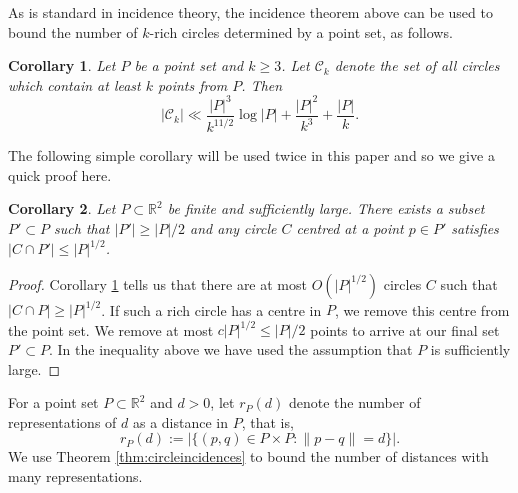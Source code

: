 \documentclass[11pt,oneside]{amsart}
\numberwithin{exercise}{subsection}
\newtheorem{cor}{Corollary}
\begin{document}
As is standard in incidence theory, the incidence theorem above can be used to bound the number of $k$-rich circles determined by a point set, as follows.

\begin{cor} \label{cor:richcircles}
Let $P$ be a point set and $k \geq 3$. Let $\mathcal C_k$ denote the set of all circles which contain at least $k$ points from $P$. Then
\[
|\mathcal C_k| \ll \frac{|P|^3}{k^{11/2}}\log|P| + \frac{|P|^2}{k^{3}}+ \frac{|P|}{k}.  
\]
\end{cor}

The following simple corollary will be used twice in this paper and so we give a quick proof here.

\begin{cor} \label{cor:norichcircles}
    Let $P \subset \mathbb R^2$ be finite and sufficiently large. There exists a subset $P' \subset P$ such that $|P'| \geq |P|/2$ and any circle $C$ centred at a point $p \in P'$ satisfies $|C \cap P'| \leq |P|^{1/2}$.
\end{cor}

\begin{proof}
    Corollary \ref{cor:richcircles} tells us that there are at most $O(|P|^{1/2})$ circles $C$ such that $|C \cap P| \geq |P|^{1/2}$. If such a rich circle has a centre in $P$, we remove this centre from the point set. We remove at most $c|P|^{1/2} \leq |P|/2$ points to arrive at our final set $P' \subset P$. In the inequality above we have used the assumption that $P$ is sufficiently large.
\end{proof}

For a point set $P \subset \mathbb R^2$ and $d>0$, let $r_P(d)$ denote the number of representations of $d$ as a distance in $P$, that is,
\[
r_P(d):=| \{(p,q) \in P \times P : \|p-q\|=d \}|.
\]
We use Theorem \ref{thm:circleincidences} to bound the number of distances with many representations.
\end{document}

